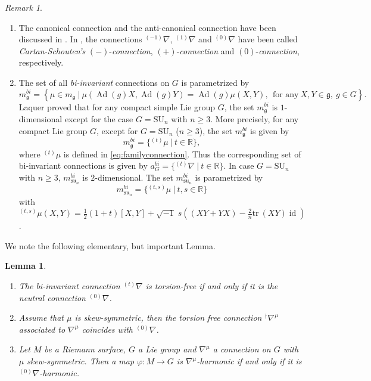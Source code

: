 \documentclass[12pt]{amsart}
\newtheorem{Lemma}[Theorem]{Lemma}
\theoremstyle{definition}
\theoremstyle{remark}
\newtheorem{Remark}[Theorem]{Remark}
\numberwithin{equation}{section}
\begin{document}
\begin{Remark} 
\mbox{}
\begin{enumerate}
\item
 The canonical connection and the anti-canonical connection have been 
 discussed in \cite{KN2, Agricola, Khemar}.
 In \cite{KN2}, the connections ${{}^{(-1)}\nabla}$, ${{}^{(1)}\nabla}$ 
 and ${{}^{(0)}\nabla}$ have been called \textit{Cartan-Schouten's} 
 $(-)$-\textit{connection}, $(+)$-\textit{connection} and $(0)$-\textit{connection}, 
 respectively. 
\item
 The set of all \textit{bi-invariant} connections on $G$ 
 is parametrized by 
\begin{equation*}
m^{bi}_{\mathfrak g}=
\left\{ \mu \in m_{\mathfrak g}\  \vert \ 
\mu({\operatorname{Ad}} (g)X,{\operatorname{Ad}} (g)Y)={\operatorname{Ad}} (g)
\mu(X,Y),\ \ \textrm{for any}\ X,Y\in \mathfrak{g}, 
\ g\in G\right\}.
\end{equation*}
 Laquer \cite{Laquer} proved that for any compact simple 
 Lie group $G$, the set 
 $m^{bi}_{\mathfrak g}$ is $1$-dimensional except 
 for the case $G=\mathrm{SU}_n$ with $n\geq 3$. 
 More precisely, for any compact Lie group $G$, except for $ G =\mathrm{SU}_n$ ($n\geq 3$), 
 the set $m^{bi}_{\mathfrak g}$ is given by 
\begin{equation*}
 m^{bi}_{\mathfrak g}=\{ {}^{(t)}\mu \  \vert \  t \in \mathbb R \},
\end{equation*}
 where ${}^{(t)}\mu$ is defined in \eqref{eq:familyconnection}.
 Thus the corresponding set of bi-invariant connections
 is given by $a^{bi}_{G}=\{{}^{(t)}\nabla\ \vert \ t\in \mathbb{R}\}$.
 In case $G=\mathrm{SU}_n$ with $n\geq 3$, 
 $m^{bi}_{\mathfrak{su}_n}$ 
 is $2$-dimensional. The set $m_{\mathfrak{su}_n}^{bi}$ is parametrized by
\begin{equation*}
 m_{\mathfrak{su}_n}^{bi}
=\{{}^{(t,s)}\mu\ \vert \ t,s\in \mathbb{R}\}
\end{equation*}
with
${}^{(t,s)}\mu(X,Y)=
\frac{1}{2}(1+t)[X,Y]
+\sqrt{-1}\; s\left(
(XY+YX)-\frac{2}{n}\mathrm{tr}\>(XY){\operatorname{id}}
\right)$.
\end{enumerate}
\end{Remark}

 We note the following elementary, but important Lemma.
\begin{Lemma}\label{lem:skewconnection}
\mbox{}
\begin{enumerate}
\item The bi-invariant connection 
 ${{}^{(t)} \nabla}$ is torsion-free if and only if it is the neutral connection ${{}^{(0)}\nabla}$.

\item Assume that $\mu$ is skew-symmetric, then the 
 torsion free connection ${}^\dag{\nabla^{\mu}}$ 
 associated to ${\nabla^{\mu}}$ coincides with ${{}^{(0)}\nabla}$. 

\item Let $M$ be a Riemann surface, $G$ a Lie group  and $\nabla^{\mu}$ a 
connection on $G$ with $\mu$ skew-symmetric. Then a map
$\varphi:M\to G$ is $\nabla^{\mu}$-harmonic if and only if it is 
${{}^{(0)}\nabla}$-harmonic.
\end{enumerate}
\end{Lemma}
\end{document}

